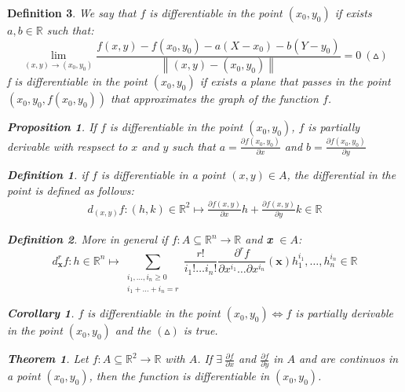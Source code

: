 \documentclass{article}
\newtheorem{theorem}{Theorem}
\newtheorem{corollary}{Corollary}
\newtheorem{definition}{Definition}
\newtheorem{proposition}{Proposition}
\begin{document}
    \begin{definition}
        We say that $f$ is differentiable in the point $(x_0, y_0)$ if exists $a,b \in \mathbb{R}$ such that:
        \begin{equation*}
            \lim_{(x, y) \to (x_0,y_0)} \frac{f(x,y)-f(x_0,y_0)-a(X-x_0)-b(Y-y_0)}{\left\lVert (x,y) - (x_0,y_0)\right\rVert } = 0  \ (\vartriangle) 
        \end{equation*}
        f is differentiable in the point $(x_0,y_0)$ if exists a plane that passes in the point $(x_0,y_0, f(x_0,y_0))$ that approximates the graph of the function $f$.
        \begin{proposition}
            If $f$ is differentiable in the point $(x_0,y_0)$, $f$ is partially derivable with respsect to $x$ and $y$ such that $a = \frac{\partial f(x_0,y_0)}{ \partial x}$ and $b = \frac{\partial f(x_0,y_0)}{ \partial y}$  
        \end{proposition}
        \begin{definition}
            if $f$ is differentiable in a point $(x,y) \in A$, the differential in the point is defined as follows:
            \begin{gather*}
                d_{(x,y)}f:(h,k) \in \mathbb{R}^2 \longmapsto \frac{\partial f(x,y)}{\partial x}h + \frac{\partial f(x,y)}{\partial y}k \in \mathbb{R}
            \end{gather*}
        \end{definition}
        \begin{definition}
            More in general if $f:A \subseteq \mathbb{R}^n \rightarrow \mathbb{R}$ and \textbf{x} $\in A$:
            \begin{equation*}
                d_{\textbf{x}}^rf:h \in \mathbb{R}^n \longmapsto \sum_{\substack{i_1, \dots, i_n \geq 0 \\ i_1 + \dots + i_n = r}}\frac{r!}{i_1! \dots i_n!}\frac{\partial ^r f}{\partial x^{i_1} \dots \partial x^{i_n}}(\textbf{x}) h^{i_1}_1, \dots,h^{i_n}_n  \in \mathbb{R}
            \end{equation*}
        \end{definition}
        \begin{corollary}
            $f$ is differentiable in the point $(x_0,y_0) \Longleftrightarrow f$ is partially derivable in the point $(x_0,y_0)$ and the $(\vartriangle)$ is true.
        \end{corollary}
    \newpage
        \begin{theorem}
            Let $f : A \subseteq \mathbb{R}^2 \rightarrow \mathbb{R}$ with $A$. If $\exists \ \frac{\partial f}{\partial x}$ and $\frac{\partial f}{\partial y}$ in $A$ and are continuos in a point $(x_0,y_0)$, then the function is differentiable in $(x_0,y_0)$.

\end{theorem}
\end{definition}
\end{document}

